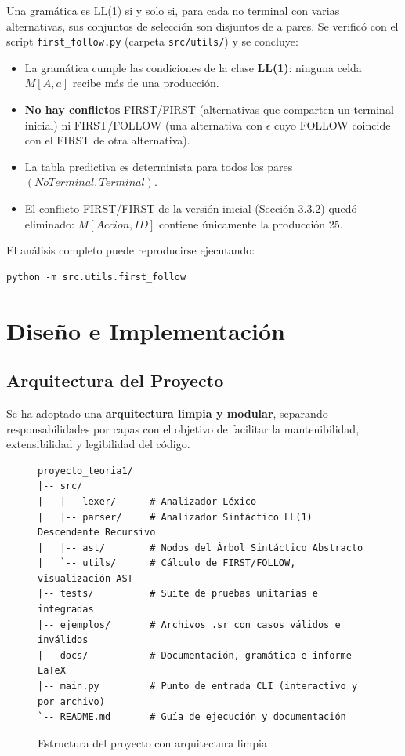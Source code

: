 \documentclass[12pt,a4paper]{article}
\begin{document}
Una gramática es LL(1) si y solo si, para cada no terminal con varias alternativas, sus conjuntos de selección son disjuntos de a pares. Se verificó con el script \texttt{first\_follow.py} (carpeta \texttt{src/utils/}) y se concluye:
\begin{itemize}[leftmargin=1cm]
    \item La gramática cumple las condiciones de la clase \textbf{LL(1)}: ninguna celda $M[A,a]$ recibe más de una producción.
    \item \textbf{No hay conflictos} FIRST/FIRST (alternativas que comparten un terminal inicial) ni FIRST/FOLLOW (una alternativa con $\epsilon$ cuyo FOLLOW coincide con el FIRST de otra alternativa).
    \item La tabla predictiva es determinista para todos los pares $(NoTerminal, Terminal)$.
    \item El conflicto FIRST/FIRST de la versión inicial (Sección 3.3.2) quedó eliminado: $M[Accion, ID]$ contiene únicamente la producción 25.
\end{itemize}

El análisis completo puede reproducirse ejecutando:
\begin{lstlisting}[style=bashstyle]
python -m src.utils.first_follow
\end{lstlisting}

\newpage

\section{Diseño e Implementación}

\subsection{Arquitectura del Proyecto}
Se ha adoptado una \textbf{arquitectura limpia y modular}, separando responsabilidades por capas con el objetivo de facilitar la mantenibilidad, extensibilidad y legibilidad del código. 

\begin{figure}[H]
\centering
\begin{lstlisting}[style=grammartyle]
proyecto_teoria1/
|-- src/
|   |-- lexer/      # Analizador Léxico
|   |-- parser/     # Analizador Sintáctico LL(1) Descendente Recursivo
|   |-- ast/        # Nodos del Árbol Sintáctico Abstracto
|   `-- utils/      # Cálculo de FIRST/FOLLOW, visualización AST
|-- tests/          # Suite de pruebas unitarias e integradas
|-- ejemplos/       # Archivos .sr con casos válidos e inválidos
|-- docs/           # Documentación, gramática e informe LaTeX
|-- main.py         # Punto de entrada CLI (interactivo y por archivo)
`-- README.md       # Guía de ejecución y documentación
\end{lstlisting}
\caption{Estructura del proyecto con arquitectura limpia}
\label{fig:estructura}
\end{figure}
\end{document}
